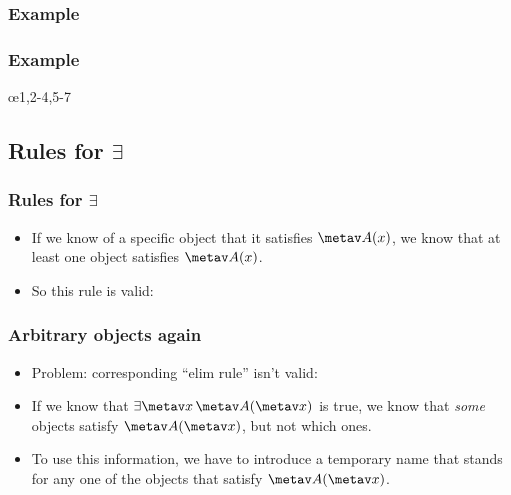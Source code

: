 \begin{frame}
\frametitle{Example}
\small
\begin{fitchproof}
  \open
  \close
\end{fitchproof}
\end{frame}

\begin{frame}
  \frametitle{Example}
  \small
  \begin{fitchproof}
    \open
\close
\open
{}
\close
  \oe{1,2-4,5-7}
  \end{fitchproof}
  \end{frame}

\newhourlecture
\subsection{Rules for $\exists$}

\begin{frame}
\frametitle{Rules for $\exists$}

\begin{itemize}[<+->]
\item If we know of a specific object that it satisfies $\metav A(x)$, we know that at least one object satisfies $\metav A(x)$.
\item So this rule is valid:
\begin{fitchproof}
\end{fitchproof}
\end{itemize}
\end{frame}

\begin{frame}
\frametitle{Arbitrary objects again}

\begin{itemize}
  \item Problem: corresponding ``elim rule'' isn't valid:
  \begin{fitchproof}
  \end{fitchproof}
  \item If we know that $\exists \metav x\, \metav A(\metav x)$ is
  true, we know that \emph{some} objects satisfy $\metav A(\metav x)$,
  but not which ones.
\item To use this information, we have to introduce a temporary name
that stands for any one of the objects that satisfy $\metav A(\metav
x)$.
\end{itemize}
\end{frame}

